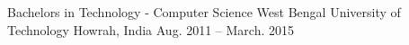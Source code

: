 

\begin{cventries}

  \cventry
    {Bachelors in Technology - Computer Science} %
    {West Bengal University of Technology} %
    {Howrah, India} %
    {Aug. 2011 – March. 2015} %
    {
      \begin{cvitems} %
      \end{cvitems}
    }

\end{cventries}
